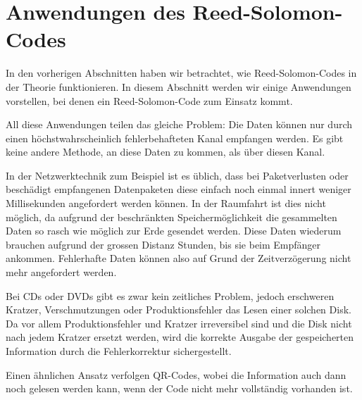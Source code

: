 %
%
%
\section{Anwendungen des Reed-Solomon-Codes
	\label{reedsolomon:section:anwendung}}

In den vorherigen Abschnitten haben wir betrachtet, wie Reed-Solomon-Codes in der Theorie funktionieren. 
In diesem Abschnitt werden wir einige Anwendungen vorstellen, bei denen ein Reed-Solomon-Code zum Einsatz kommt.

All diese Anwendungen teilen das gleiche Problem: Die Daten können nur durch einen höchstwahrscheinlich fehlerbehafteten Kanal empfangen werden. Es gibt keine andere Methode, an diese Daten zu kommen, als über diesen Kanal.

In der Netzwerktechnik zum Beispiel ist es üblich, dass bei Paketverlusten oder beschädigt empfangenen Datenpaketen diese einfach noch einmal innert weniger Millisekunden angefordert werden können.
%
In der Raumfahrt ist dies nicht möglich, da aufgrund der beschränkten Speichermöglichkeit die gesammelten Daten so rasch wie möglich zur Erde gesendet werden. 
%
Diese Daten wiederum brauchen aufgrund der grossen Distanz Stunden, bis sie beim Empfänger ankommen.
Fehlerhafte Daten können also auf Grund der Zeitverzögerung nicht mehr angefordert werden. 

Bei CDs oder DVDs gibt es zwar kein zeitliches Problem, jedoch erschweren Kratzer, Verschmutzungen oder Produktionsfehler das Lesen einer solchen Disk.
%
%
%
%
Da vor allem Produktionsfehler und Kratzer irreversibel sind und die Disk nicht nach jedem Kratzer ersetzt werden, wird die korrekte Ausgabe der gespeicherten Information durch die Fehlerkorrektur sichergestellt. 

Einen ähnlichen Ansatz verfolgen QR-Codes, wobei die Information auch dann noch gelesen werden kann, wenn der Code nicht mehr vollständig vorhanden ist. 
%

%
%
%
%
%

